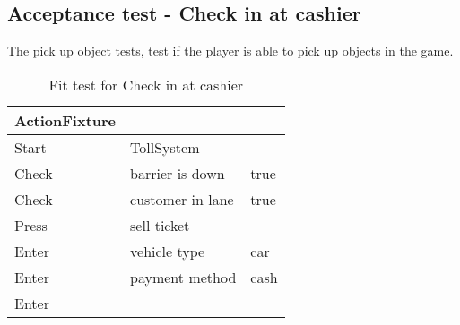 \subsection{Acceptance test - Check in at cashier}
The pick up object tests, test if the player is able to pick up objects in the game.

\begin{table}[H]
    \centering
    \begin{tabular}{| l | l | l |}
        \hline
        \textbf{ActionFixture} &  &  \\\hline
        Start & TollSystem &  \\\hline
        Check & barrier is down & true  \\\hline
        Check & customer in lane & true  \\\hline
        Press & sell ticket &  \\\hline
        Enter & vehicle type & car \\\hline
        Enter & payment method & cash \\\hline
        Enter & & \\\hline
    \end{tabular}
    \caption{Fit test for Check in at cashier}
\end{table}